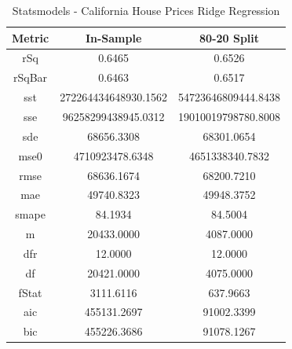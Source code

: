 \documentclass{article}
\begin{document}
\begin{table}[H]
\centering
\caption{Statsmodels - California House Prices Ridge Regression}
\label{tab:Statsmodels - House Prices Ridge Regression}
\begin{tabular}{|c|c|c|}\hline
Metric & In-Sample & 80-20 Split \\ \hline \hline
rSq & 0.6465 & 0.6526 \\ \hline
rSqBar & 0.6463 & 0.6517 \\ \hline
sst & 272264434648930.1562 & 54723646809444.8438 \\ \hline
sse & 96258299438945.0312 & 19010019798780.8008 \\ \hline
sde & 68656.3308 & 68301.0654 \\ \hline
mse0 & 4710923478.6348 & 4651338340.7832 \\ \hline
rmse & 68636.1674 & 68200.7210 \\ \hline
mae & 49740.8323 & 49948.3752 \\ \hline
smape & 84.1934 & 84.5004 \\ \hline
m & 20433.0000 & 4087.0000 \\ \hline
dfr & 12.0000 & 12.0000 \\ \hline
df & 20421.0000 & 4075.0000 \\ \hline
fStat & 3111.6116 & 637.9663 \\ \hline
aic & 455131.2697 & 91002.3399 \\ \hline
bic & 455226.3686 & 91078.1267 \\ \hline
\end{tabular}
\end{table}
\end{document}
